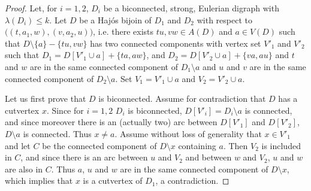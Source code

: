 \begin{proof} 
    Let, for $i=1,2$,  $D_i$ be a biconnected, strong, Eulerian digraph with $\lambda(D_i) \leq k$.
    Let $D$ be a Haj\'os bijoin of $D_1$ and $D_2$ with respect to $\big((t,a_1,w), (v,a_2, u)\big)$, i.e. there exists $tu,vw \in A(D)$ and $a \in V(D)$ such that $D\setminus \{a\} - \{tu,vw\}$ has two connected components with vertex set $V'_1$ and $V'_2$ such that $D_1=D[V'_1 \cup a] + \{ta,aw\}$, and $D_2= D[V'_2 \cup a] + \{va,au\}$ and $t$ and $w$ are in the same connected component of $D_1\setminus a$ and  $u$ and $v$ are in the same connected component of $D_2\setminus a$. 
    Set $V_1=V'_1 \cup a$ and $V_2 = V'_2 \cup a$.  
    \smallskip 

    Let us first prove that $D$ is biconnected. 
    Assume for contradiction that $D$ has a cutvertex $x$. 
    Since for $i=1, 2$ $D_i$ is biconnected, $D[V'_i]=D_i\setminus a$ is connected, and since moreover there is an (actually two) arc between $D[V'_1]$ and $D[V'_2]$, $D \setminus a$ is connected. Thus $x \neq a$. 
    Assume without loss of generality that $x \in V'_1$ and let $C$ be the connected component of $D \setminus x$ containing $a$. Then $V_2$ is included in $C$, and since there is an arc between $u$ and $V_2$ and between $w$ and $V_2$, $u$ and $w$ are also in $C$. Thus $a$, $u$ and $w$ are in the same connected component of $D \setminus x$, which implies that $x$ is a cutvertex of $D_1$, a contradiction. 
    


\end{proof}
